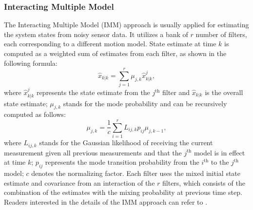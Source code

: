 \documentclass[journal]{IEEEtran}
\begin{document}
	\subsubsection{Interacting Multiple Model}\label{subsec:imm}
	
	The Interacting Multiple Model (IMM) approach is usually applied for estimating the system states from noisy sensor data.
	It utilizes a bank of $r$ number of filters, each corresponding to a different motion model.
	State estimate at time $k$ is computed as a weighted sum of estimates from each filter, as shown in the following formula:
	\begin{equation}
		\hat{x}_{k|k}=\sum\limits_{j=1}^{r}\mu_{j,k}\hat{x}^j_{k|k}, \label{eqn:imm_eq}
	\end{equation}\normalsize 
	where $\hat{x}^j_{k|k}$ represents the state estimate from the $j^\text{th}$ filter and $\hat{x}_{k|k}$ is the overall state estimate; $\mu_{j,k}$ stands for the mode probability and can be recursively computed as follows:
	\[
	\mu_{j,k}=\frac{1}{c}\sum\limits_{i=1}^{r}L_{ij,k}p_{ij}\mu_{j,k-1},
	\]\normalsize
	where $L_{ij,k}$ stands for the Gaussian likelihood of receiving the current measurement given all previous measurements and that the $j^\text{th}$ model is in effect at time $k$; $p_{ij}$ represents the mode transition probability from the $i^\text{th}$ to the $j^\text{th}$ model; $c$ denotes the normalizing factor. 
	Each filter uses the mixed initial state estimate and covariance from an interaction of the $r$ filters, which consists of the combination of the estimates with the mixing probability at previous time step.
	Readers interested in the details of the IMM approach can refer to \cite{yaakov2001estimation}.
	
\end{document}

